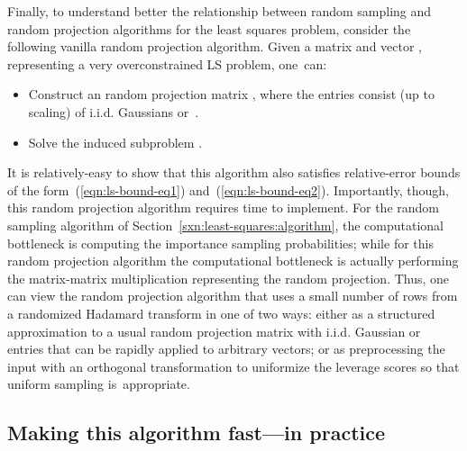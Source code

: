 \documentclass[twoside]{article}
\begin{document}
Finally, to understand better the relationship between random sampling and 
random projection algorithms for the least squares problem, consider the
following vanilla random projection algorithm.
Given a matrix  and vector , representing a very overconstrained LS 
problem, one~can:
\begin{itemize}
\item
Construct an  random projection matrix 
, where the entries consist (up to scaling) of i.i.d. Gaussians 
or~.
\item
Solve the induced subproblem
.
\end{itemize}
It is relatively-easy to show that this algorithm also satisfies relative-error bounds of the 
form~(\ref{eqn:ls-bound-eq1}) and~(\ref{eqn:ls-bound-eq2}).
Importantly, though, this random projection algorithm 
requires  time to implement.
For the random sampling algorithm of 
Section~\ref{sxn:least-squares:algorithm}, the  computational 
bottleneck is computing the importance sampling probabilities; while for 
this random projection algorithm the  computational bottleneck is 
actually performing the matrix-matrix multiplication representing the random 
projection.
Thus, one can view the  random projection algorithm that uses a 
small number of rows from a randomized Hadamard transform in one of two 
ways: either as a structured approximation to a usual random projection 
matrix with i.i.d. Gaussian or~ entries that can be rapidly 
applied to arbitrary vectors; or as preprocessing the input with an 
orthogonal transformation to uniformize the leverage scores so that uniform 
sampling is~appropriate.



\subsection{Making this algorithm fast---in practice}
\label{sxn:least-squares:faster-pr}
\end{document}
